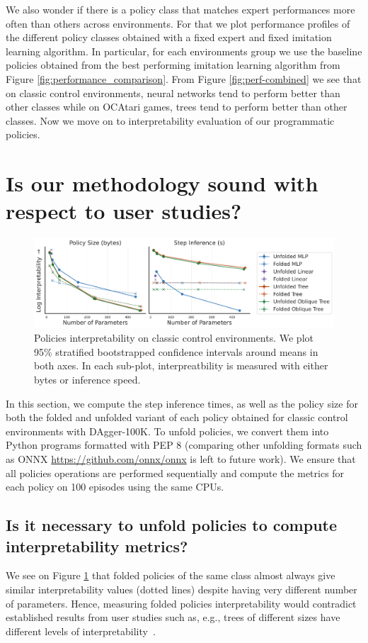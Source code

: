 We also wonder if there is a policy class that matches expert performances more often than others across environments. For that we plot performance profiles of the different policy classes obtained with a fixed expert and fixed imitation learning algorithm. In particular, for each environments group we use the baseline policies obtained from the best performing imitation learning algorithm from Figure \ref{fig:performance_comparison}. From Figure \ref{fig:perf-combined} we see that on classic control environments, neural networks tend to perform better than other classes while on OCAtari games, trees tend to perform better than other classes. Now we move on to interpretability evaluation of our programmatic policies.

\section{Is our methodology sound with respect to user studies?}

\begin{figure}
    \centering
    \includegraphics[width=1\linewidth]{images/images_part3/tree_sizes_memory_ppo_ci_ablation.pdf}
    \caption{Policies interpretability on classic control environments. We plot 95\% stratified bootstrapped confidence intervals around means in both axes. In each sub-plot, interpreatbility is measured with either bytes or inference speed.}
    \label{fig:abl-proxies}
\end{figure}

In this section, we compute the step inference times, as well as the policy size for both the folded and unfolded variant of each policy obtained for classic control environments with DAgger-100K. To unfold policies, we convert them into Python programs formatted with PEP 8 (comparing other unfolding formats such as ONNX \url{https://github.com/onnx/onnx} is left to future work). We ensure that all policies operations are performed sequentially and compute the metrics for each policy on 100 episodes using the same CPUs.

\subsection{Is it necessary to unfold policies to compute interpretability metrics?} We see on Figure \ref{fig:abl-proxies} that folded policies of the same class almost always give similar interpretability values (dotted lines) despite having very different number of parameters. Hence, measuring folded policies interpretability would contradict established results from user studies such as, e.g., trees of different sizes have different levels of interpretability~\cite{study-4}. 

